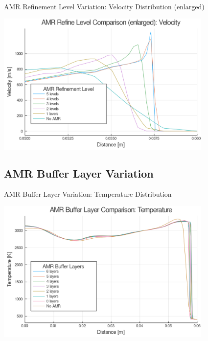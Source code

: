 \begin{frame}{AMR Refinement Level Variation: Velocity Distribution (enlarged)}
\begin{center}
\includegraphics[width=0.8\textwidth]{../figs/amrfigs/amr_refinelevels/ue.png}
\end{center}
\end{frame}

\subsection{AMR Buffer Layer Variation}

\begin{frame}{AMR Buffer Layer Variation: Temperature Distribution}
\begin{center}
\includegraphics[width=0.8\textwidth]{../figs/amrfigs/amr_bufflayers/t.png}
\end{center}
\end{frame}

